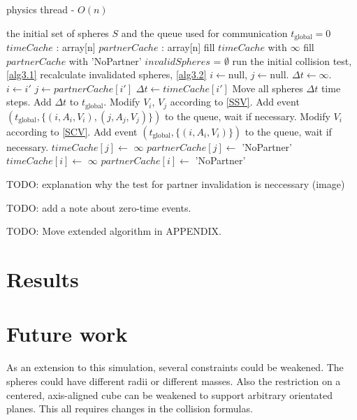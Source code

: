 \documentclass[journal, letterpaper]{IEEEtran}
\begin{document}
\begin{algorithm}
\caption{physics thread - $O(n)$}
\label{alg3}
\begin{algorithmic}
	\REQUIRE the initial set of spheres $S$ and the queue used for communication
	\STATE $t_\text{global}=0$ 
	\STATE $timeCache$ : array[n]
	\STATE $partnerCache$ : array[n]
	\STATE fill $timeCache$ with $\infty$
	\STATE fill $partnerCache$ with 'NoPartner'
	\STATE $invalidSpheres$ = $\emptyset$ 
	\STATE run the initial collision test, \ref{alg3.1}
		\STATE recalculate invalidated spheres, \ref{alg3.2}
		\STATE $i \leftarrow \text{null}$, $j \leftarrow \text{null}$.
		\STATE $\Delta t \leftarrow  \infty$.
				\STATE $i \leftarrow i'$
				\STATE $j \leftarrow partnerCache[i']$
				\STATE $\Delta t \leftarrow timeCache[i']$
			\ENDIF
		\ENDFOR
		\STATE Move all spheres $\Delta t$ time steps.
		\STATE Add $\Delta t$ to $t_\text{global}$.
			\STATE Modify $V_i$, $V_j$ according to \ref{SSV}.
			\STATE Add event $(t_\text{global}, \{(i, A_i, V_i), (j, A_j, V_j)\})$ to the queue, wait if necessary.
			\STATE Modify $V_i$ according to \ref{SCV}.
			\STATE Add event $(t_\text{global}, \{(i, A_i, V_i)\})$ to the queue, wait if necessary.
			\STATE $timeCache[j] \leftarrow$ $\infty$
			\STATE $partnerCache[j] \leftarrow$ 'NoPartner'
		\ENDIF
		\STATE $timeCache[i] \leftarrow$ $\infty$
		\STATE $partnerCache[i] \leftarrow$ 'NoPartner'
	\ENDLOOP
\end{algorithmic}
\end{algorithm}

TODO: explanation why the test for partner invalidation is neccessary (image)

TODO: add a note about zero-time events.

TODO: Move extended algorithm in APPENDIX.

\section{Results}

\section{Future work}
As an extension to this simulation, several constraints could be weakened. The spheres could have different radii or different masses. Also the restriction on a centered, axis-aligned cube can be weakened to support arbitrary orientated planes. This all requires changes in the collision formulas.
\end{document}
